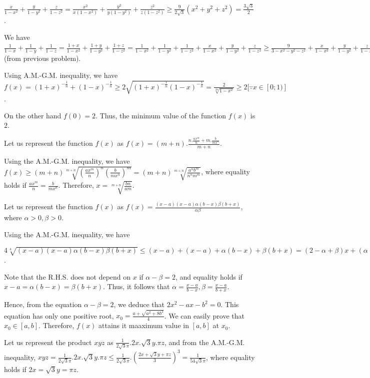   $\frac{x}{1 - x^2} + \frac{y}{1 - y^2} + \frac{z}{1 - z^2} = \frac{x^2}{x(1 - x^2)} + \frac{y^2}{y(1 -
  y^2)} + \frac{z^2}{z(1 - z^2)}\geq \frac{9}{2\sqrt{3}}(x^2 + y^2 + z^2) = \frac{3\sqrt{3}}{2}$.
\item We have $\frac{1}{1 - x} + \frac{1}{1 - y} + \frac{1}{1 - z} = \frac{1 + x}{1 - x^2} + \frac{1 + y}{1
  - y^2} + \frac{1 + z}{1 - z^2} = \frac{1}{1 - x^2} + \frac{1}{1 - y^2} + \frac{1}{1 - z^2} + \frac{x}{1 -
  x^2} + \frac{y}{1 - y^2} + \frac{z}{1 - z^2} \geq \frac{9}{3 - x^2 - y^2 - z^2} + \frac{x}{1 -
  x^2} + \frac{y}{1 - y^2} + \frac{z}{1 - z^2}\geq \frac{9}{2} + \frac{3\sqrt{3}}{2}$(from previous
  problem).
\item Using A.M.-G.M. inequality, we have $f(x) = (1 + x)^{-\frac{1}{n}} + (1 - x)^{-\frac{1}{n}}\geq
  2\sqrt{(1 + x)^{-\frac{1}{n}}(1 - x)^{-\frac{1}{n}}} = \frac{2}{\sqrt[2n]{1 - x^2}}\geq 2[\because
    x\in[0;1)]$.

    On the other hand $f(0) = 2$. Thus, the minimum value of the function $f(x)$ is $2$.
\item Let us represent the function $f(x)$ as $f(x) = (m + n).\frac{n.\frac{ax^m}{n} + m.\frac{b}{mx^n}}{m +
  n}$.

  Using the A.M.-G.M. inequality, we have $f(x)\geq (m + n)\sqrt[m +
    n]{\left(\frac{ax^m}{n}\right)^n\left(\frac{b}{mx^n}\right)^m} = (m + n)\sqrt[m +
    n]{\frac{a^nb^m}{n^nm^m}}$, where equality holds if $\frac{ax^m}{n} = \frac{b}{mx^n}$. Therefore, $x =
  \sqrt[m + n]{\frac{bn}{am}}$.
\item Let us represent the function $f(x)$ as $f(x) = \frac{(x - a)(x - a)\alpha(b - x)\beta(b +
  x)}{\alpha\beta}$, where $\alpha > 0, \beta > 0$.

  Using the A.M.-G.M. inequality, we have

  $4\sqrt[4]{(x - a)(x - a)\alpha(b - x)\beta(b + x)}\leq (x - a) + (x - a) + \alpha(b - x) + \beta(b + x) =
  (2 - \alpha + \beta)x + (\alpha + \beta)b - 2a$.

  Note that the R.H.S. does not depend on $x$ if $\alpha - \beta = 2$, and equality holds if $x - a =
  \alpha(b - x) = \beta(b + x)$. Thus, it follows that $\alpha = \frac{x - a}{b - x}, \beta = \frac{x - a}{b
    + x}$.

  Hence, from the equation $\alpha - \beta = 2$, we deduce that $2x^2 - ax - b^2 = 0$. This equation has
  only one positive root, $x_0 = \frac{a + \sqrt{a^2 + 8b^2}}{4}$. We can easily prove that $x_0\in[a,
    b]$. Therefore, $f(x)$ attains it maaximum value in $[a, b]$ at $x_0$.
\item Let us represent the product $xyz$ as $\frac{1}{2\sqrt{3}\pi}.2x.\sqrt{3}y.\pi z$, and from the
  A.M.-G.M. inequality, $xyz = \frac{1}{2\sqrt{3}\pi}.2x.\sqrt{3}y.\pi z\leq
  \frac{1}{2\sqrt{3}\pi}.\left(\frac{2x + \sqrt{3}y + \pi z}{3}\right)^3 = \frac{1}{54\sqrt{3}\pi}$, where
  equality holds if $2x = \sqrt{3}y = \pi z$.

